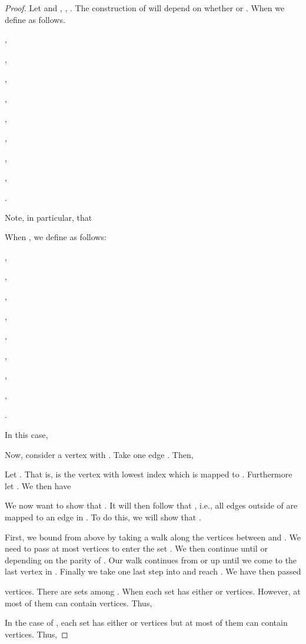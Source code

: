 \documentclass[11pt,a4paper]{article}
\begin{document}
\begin{proof}
Let  and , , . The construction of  will depend on whether  or .
When  we define  as follows.

,

,

 

,

,



,

,



,

,



.

\noindent
Note, in particular, that

When , we define  as follows:

, 

,

 

,

,



,

,



,

,



.

\noindent
In this case,


Now,
consider a vertex  with . Take one edge . Then,

Let . That is,  is the vertex with lowest index which is mapped to . Furthermore let . We then have

We now want to show that . It will then follow that , i.e., all edges outside of  are mapped to an edge in .
To do this, we will show that .

First, we bound  from above by taking a walk along the vertices between  and . We need to pass at most  vertices to enter the set . We then continue until  or  depending on the parity of . Our walk continues from  or  up until we come to the last vertex in . Finally we take one last step into  and reach . We have then passed

vertices. There are  sets among . When  each set has either  or  vertices. However, at most  of them can contain  vertices. Thus,

In the case of , each set has either  or  vertices but at most  of them can contain  vertices. Thus,


\end{proof}
\end{document}
